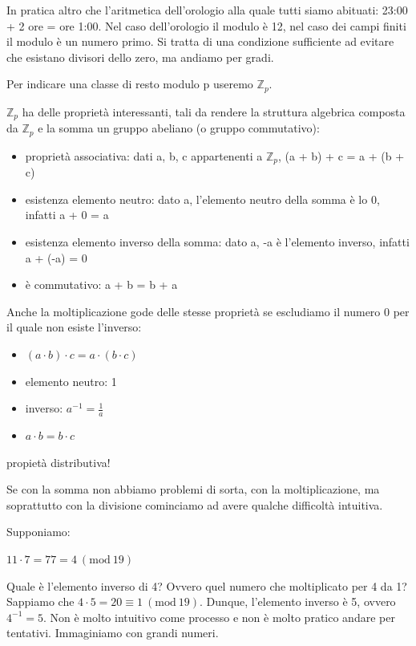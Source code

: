 \documentclass{book}
\theoremstyle{definition}
\newcommand{\Mod}[1]{\ (\mathrm{mod}\ #1)}
\newcommand{\Zp}{\mathbb{Z}_{p}}
\begin{document}
In pratica altro che l'aritmetica dell'orologio alla quale tutti siamo abituati: 23:00 + 2 ore = ore 1:00.
Nel caso dell'orologio il modulo è 12, nel caso dei campi finiti il modulo è un numero primo. Si tratta di una condizione sufficiente ad evitare che esistano divisori dello zero, ma andiamo per gradi.

Per indicare una classe di resto modulo p useremo $\Zp$.

$\mathbb{Z}_{p}$ ha delle proprietà interessanti, tali da rendere la struttura algebrica composta da $\Zp$ e la somma un gruppo abeliano (o gruppo commutativo):

\begin{itemize}
    \item proprietà associativa: dati a, b, c appartenenti a $\Zp$, (a + b) + c = a + (b + c)
    \item esistenza elemento neutro: dato a, l’elemento neutro della somma è lo 0, infatti a + 0 = a
    \item esistenza elemento inverso della somma: dato a, -a è l’elemento inverso, infatti a + (-a) = 0
    \item è commutativo: a + b = b + a
\end{itemize}

Anche la moltiplicazione gode delle stesse proprietà se escludiamo il numero 0 per il quale non esiste l’inverso:

\begin{itemize}
    \item $(a \cdot b) \cdot c = a \cdot (b \cdot c)$
    \item elemento neutro: 1
    \item inverso: $a^{-1} = \frac{1}{a}$
    \item $a \cdot b = b \cdot c$
\end{itemize}

propietà distributiva!

Se con la somma non abbiamo problemi di sorta, con la moltiplicazione, ma soprattutto con la divisione cominciamo ad avere qualche difficoltà intuitiva.

Supponiamo:

$11 \cdot 7 = 77 = 4 \Mod{19}$

Quale è l’elemento inverso di 4? Ovvero quel numero che moltiplicato per 4 da 1? 
Sappiamo che $4 \cdot 5 = 20 \equiv 1 \Mod{19}$. 
Dunque, l’elemento inverso è 5, ovvero $4^{-1} = 5$. 
Non è molto intuitivo come processo e non è molto pratico andare per tentativi. Immaginiamo con grandi numeri.
\end{document}
